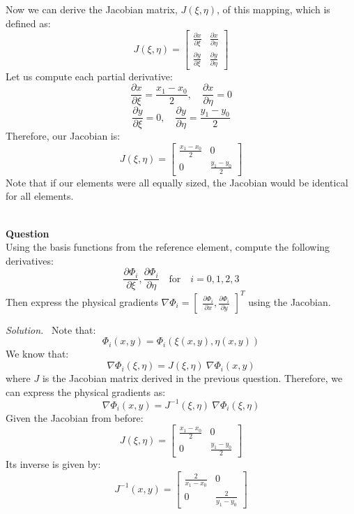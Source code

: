 \documentclass[12pt]{article}
\newcounter{question}
\newcounter{subquest}
\newcommand{\question}{
    \stepcounter{question} 
    \newpage
    \vspace{1.5em}
    \textbf{\\ \Large Question \thequestion \ }
    \vspace{.5em} 
    \setcounter{subquest}{0}\ \\}
\newcommand{\solution}
    {\par\vspace{0.5em}\noindent\emph{Solution.}\ }
    {\par\vspace{1em}}
\begin{document}
Now we can derive the Jacobian matrix, $J(\xi,\eta)$, of this mapping, which is defined as:
\[J(\xi,\eta) = \begin{bmatrix}
\frac{\partial x}{\partial \xi} & \frac{\partial x}{\partial \eta} \\
\frac{\partial y}{\partial \xi} & \frac{\partial y}{\partial \eta}
\end{bmatrix}\]
Let us compute each partial derivative:
\[\frac{\partial x}{\partial \xi} = \frac{x_1 - x_0}{2}, \quad \frac{\partial x}{\partial \eta} = 0\]
\[\frac{\partial y}{\partial \xi} = 0, \quad \frac{\partial y}{\partial \eta} = \frac{y_1 - y_0}{2}\]
Therefore, our Jacobian is:
\[J(\xi,\eta) = \begin{bmatrix}
\frac{x_1 - x_0}{2} & 0 \\ 
0 & \frac{y_1 - y_0}{2}
\end{bmatrix}\]
Note that if our elements were all equally sized, the Jacobian would be identical for all elements.

\question
Using the basis functions from the reference element, compute the following derivatives:
\[\frac{\partial \Phi_i}{\partial \xi}, \frac{\partial \Phi_i}{\partial \eta} \quad \text{for} \quad i=0,1,2,3\]
Then express the physical gradients $\nabla \Phi_i = 
\begin{bmatrix}\frac{\partial \Phi_i}{\partial x}, \frac{\partial \Phi_i}{\partial y}\end{bmatrix}^T$ using the Jacobian.

\solution
Note that:
\[\Phi_i(x,y) = \Phi_i(\xi(x,y), \eta(x,y))\]
We know that:
\[\nabla \Phi_i(\xi,\eta) = J(\xi,\eta) \ \nabla \Phi_i(x,y)\]
where $J$ is the Jacobian matrix derived in the previous question. Therefore, we can express the physical gradients as:
\[\nabla \Phi_i(x,y) = J^{-1}(\xi,\eta) \ \nabla \Phi_i(\xi,\eta)\]
Given the Jacobian from before:
\[J(\xi,\eta) = \begin{bmatrix}
\frac{x_1 - x_0}{2} & 0 \\ 
0 & \frac{y_1 - y_0}{2}
\end{bmatrix}\]
Its inverse is given by:
\[J^{-1}(x,y) = \begin{bmatrix}
\frac{2}{x_1 - x_0} & 0 \\ 
0 & \frac{2}{y_1 - y_0}
\end{bmatrix}\]
\end{document}
